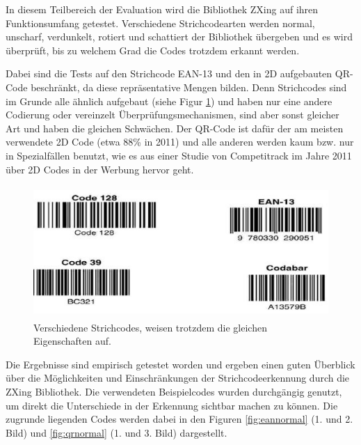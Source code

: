 \writtenby{\dcauthornameriren}%
In diesem Teilbereich der Evaluation wird die Bibliothek ZXing auf ihren Funktionsumfang getestet.
Verschiedene Strichcodearten werden normal, unscharf, verdunkelt, rotiert und schattiert der Bibliothek übergeben und es wird überprüft, bis zu welchem Grad die Codes trotzdem erkannt werden.

Dabei sind die Tests auf den Strichcode EAN-13 und den in 2D aufgebauten QR-Code beschränkt, da diese repräsentative Mengen bilden. Denn Strichcodes sind im Grunde alle ähnlich aufgebaut (siehe Figur \ref*{fig:similarcodes}) und haben nur eine andere Codierung oder vereinzelt Überprüfungsmechanismen, sind aber sonst gleicher Art und haben die gleichen Schwächen. Der QR-Code ist dafür der am meisten verwendete 2D Code (etwa 88\% in 2011) und alle anderen werden kaum bzw. nur in Spezialfällen benutzt, wie es aus einer Studie von Competitrack im Jahre 2011 über 2D Codes in der Werbung hervor geht.
~\cite{Cometitrack2011}

\begin{figure}[H]
  \centering
  \includegraphics[height=5cm]{img/EAN13/strichcodes.jpg}
  \caption{Verschiedene Strichcodes, weisen trotzdem die gleichen Eigenschaften auf.}
  \label{fig:similarcodes}
\end{figure}

Die Ergebnisse sind empirisch getestet worden und ergeben einen guten Überblick über die Möglichkeiten und Einschränkungen der Strichcodeerkennung durch die ZXing Bibliothek. Die verwendeten Beispielcodes wurden durchgängig genutzt, um direkt die Unterschiede in der Erkennung sichtbar machen zu können. Die zugrunde liegenden Codes werden dabei in den Figuren \ref*{fig:eannormal} (1. und 2. Bild) und \ref*{fig:qrnormal} (1. und 3. Bild) dargestellt.
